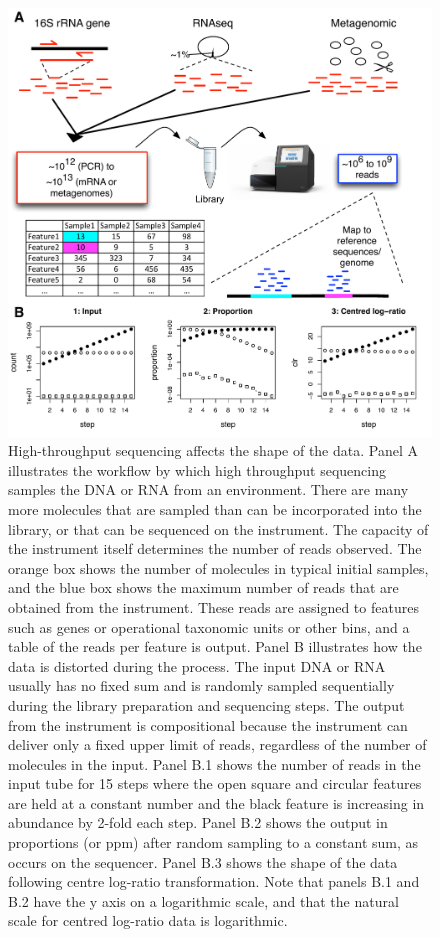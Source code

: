\documentclass[article]{ajs}\usepackage[]{graphicx}\usepackage[]{color}
\begin{document}
\begin{figure}[!ht]
\centerline{\includegraphics[width=4.6in]{fig_1.pdf}}
\vspace{3mm} \caption{High-throughput sequencing affects the shape of the data. Panel A illustrates the workflow by which high throughput sequencing samples the DNA or RNA from an environment. There are many more molecules that are sampled than can be incorporated into the library, or that can be sequenced on the instrument. The capacity of the instrument itself determines the number of reads observed. The orange box shows the number of molecules in typical initial samples, and the blue box shows the maximum number of reads that are obtained from the instrument. These reads are assigned to features such as genes or operational taxonomic units or other bins, and a table of the reads per feature is output. Panel B illustrates how the data is distorted during the process. The input DNA or RNA usually has no fixed sum and is randomly sampled sequentially   during the library preparation and sequencing steps. The output from the  instrument is compositional because the instrument can deliver only a fixed upper limit of reads, regardless of the number of molecules in the input. Panel B.1 shows the number of reads in the input tube for 15 steps where the open square and circular features are held at a constant number and the black feature is increasing in abundance by 2-fold each step. Panel B.2 shows the output in proportions (or ppm) after random sampling to a constant sum, as occurs on the sequencer. Panel B.3 shows the shape of the data following centre log-ratio transformation. Note that panels B.1 and B.2 have the y axis on a logarithmic scale, and that the natural scale for centred log-ratio data is logarithmic.}
\label{fig:design}
\end{figure}
\end{document}
